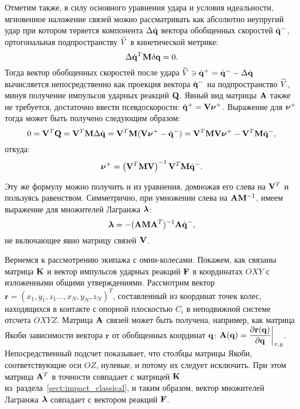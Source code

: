 Отметим также, в силу основного уравнения удара и условия идеальности, мгновенное наложение связей можно рассматривать как абсолютно неупругий удар при котором теряется компонента $\Delta\dot{\mathbf{q}}$ вектора обобщенных скоростей $\dot{\mathbf{q}}^-$, ортогональная подпространству $\widetilde{V}$ в кинетической метрике:
\begin{equation*}
    \Delta\dot{\mathbf{q}}^T\mathbf{M}\delta\mathbf{q} = 0.
\end{equation*}
Тогда вектор обобщенных скоростей после удара $\widetilde{V} \ni \dot{\mathbf{q}}^+ = \dot{\mathbf{q}}^- - \Delta\dot{\mathbf{q}}$ вычисляется непосредственно как проекция вектора $\dot{\mathbf{q}}^-$ на подпространство $\widetilde{V}$, минуя получение импульсов ударных реакций $\mathbf{Q}$. Явный вид матрицы $\mathbf{A}$ также не требуется, достаточно ввести псевдоскорости: $\dot{\mathbf{q}}^+ = \mathbf{V}\boldsymbol{\mathbf{\nu}}^+$.
Выражение для $\boldsymbol{\mathbf{\nu}}^+$ тогда может быть получено следующим образом:
\begin{equation*}
    0 = \mathbf{V}^T\mathbf{Q} = \mathbf{V}^T\mathbf{M}\Delta\dot{\mathbf{q}} = \mathbf{V}^T\mathbf{M}(\mathbf{V}\boldsymbol{\mathbf{\nu}}^+ - \dot{\mathbf{q}}^-) = \mathbf{V}^T\mathbf{M}\mathbf{V}\boldsymbol{\mathbf{\nu}}^+ - \mathbf{V}^T\mathbf{M}\dot{\mathbf{q}}^-,
\end{equation*}
откуда:
\begin{equation*}
\boldsymbol{\mathbf{\nu}}^+ = \left( \mathbf{V}^T\mathbf{M}\mathbf{V} \right)^{-1}\mathbf{V}^T\mathbf{M}\dot{\mathbf{q}}^-.
\end{equation*}

Эту же формулу можно получить и из уравнения, домножая его слева на $\mathbf{V}^T$ и пользуясь равенством. Симметрично, при умножении слева на $\mathbf{A}\mathbf{M}^{-1}$, имеем выражение для множителей Лагранжа $\boldsymbol{\mathbf{\lambda}}$:
\begin{equation*}
    \boldsymbol{\mathbf{\lambda}} = -(\mathbf{A} \mathbf{M} \mathbf{A}^T)^{-1}\mathbf{A}\dot{\mathbf{q}}^-,
\end{equation*}
не включающее явно матрицу связей $\mathbf{V}$.

Вернемся к рассмотрению экипажа с омни-колесами. Покажем, как связаны матрица $\mathbf{K}$ и вектор импульсов ударных реакций $\mathbf{F}$ в координатах $OXY$ с изложенными общими утверждениями.
Рассмотрим вектор $\mathbf{r} = ( x_1, y_1, z_1 \ldots, x_N, y_N, z_N )^T$, составленный из координат точек колес, находящихся в контакте с опорной плоскостью $C_i$ в неподвижной системе отсчета $OXYZ$.
Матрица $\mathbf{A}$ связей может быть получена, например, как матрица Якоби зависимости вектора $\mathbf{r}$ от обобщенных координат $\mathbf{q}$: $\mathbf{A}(\mathbf{q}) = \displaystyle\frac{\displaystyle \partial \mathbf{r}(\mathbf{q})}{\displaystyle \partial \mathbf{q}}\bigg|_{x,y}$.
Непосредственный подсчет показывает, что столбцы матрицы Якоби, соответствующие оси $OZ$, нулевые, и потому их следует исключить.
При этом матрица $\mathbf{A}^T$ в точности совпадает с матрицей $\mathbf{K}$ из~раздела~\ref{sect:impact_classical}, и таким образом, вектор множителей Лагранжа $\boldsymbol{\mathbf{\lambda}}$ совпадает с вектором реакций $\mathbf{F}$.
